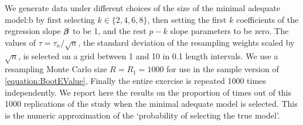 We generate data under different choices of the size of the minimal adequate model:b by first selecting $k \in \{ 2, 4, 6, 8 \}$, then setting the first $k$ coefficients of the regression slope ${\boldsymbol{\beta}}$ to be 1, and the rest $p - k$ slope parameters to be zero. The values of $\tau = \tau_{n} / \sqrt n$, the standard deviation of the resampling weights scaled by $\sqrt n$, is selected on a grid between 1 and 10 in 0.1 length intervals. We use a resampling Monte Carlo size $R = R_{1} = 1000$ for use in the sample version of \ref{equation:BootEValue}, Finally the entire exercise is repeated 1000 times independently. We report here the results on the proportion of times out of this 1000 replications of the study when the minimal adequate model is selected. This is the numeric approximation of the `probability of selecting the true model'.  

